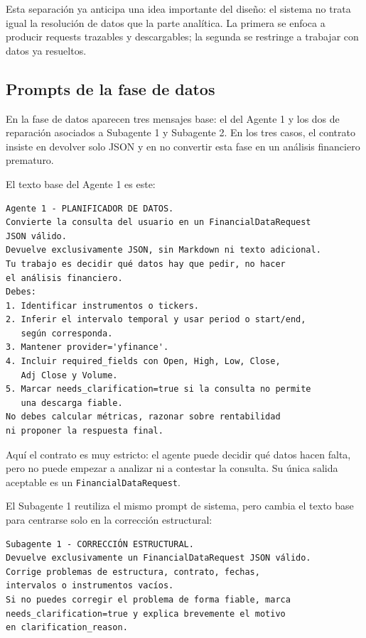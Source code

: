 Esta separaci\'on ya anticipa una idea importante del dise\~no: el sistema no trata igual la resoluci\'on de datos que la parte anal\'itica. La primera se
enfoca a producir requests trazables y descargables; la segunda se restringe a trabajar con datos ya resueltos.

\subsection{Prompts de la fase de datos}

En la fase de datos aparecen tres mensajes base: el del Agente 1 y los dos de reparaci\'on asociados a Subagente 1 y Subagente 2. En los tres casos, el
contrato insiste en devolver solo JSON y en no convertir esta fase en un an\'alisis financiero prematuro.

El texto base del Agente 1 es este:

\begin{lstlisting}[style=promptblock]
Agente 1 - PLANIFICADOR DE DATOS.
Convierte la consulta del usuario en un FinancialDataRequest
JSON válido.
Devuelve exclusivamente JSON, sin Markdown ni texto adicional.
Tu trabajo es decidir qué datos hay que pedir, no hacer
el análisis financiero.
Debes:
1. Identificar instrumentos o tickers.
2. Inferir el intervalo temporal y usar period o start/end,
   según corresponda.
3. Mantener provider='yfinance'.
4. Incluir required_fields con Open, High, Low, Close,
   Adj Close y Volume.
5. Marcar needs_clarification=true si la consulta no permite
   una descarga fiable.
No debes calcular métricas, razonar sobre rentabilidad
ni proponer la respuesta final.
\end{lstlisting}

Aqu\'i el contrato es muy estricto: el agente puede decidir qu\'e datos hacen falta, pero no puede empezar a analizar ni a contestar la consulta. Su \'unica
salida aceptable es un \texttt{FinancialDataRequest}.

El Subagente 1 reutiliza el mismo prompt de sistema, pero cambia el texto base para centrarse solo en la correcci\'on estructural:

\begin{lstlisting}[style=promptblock]
Subagente 1 - CORRECCIÓN ESTRUCTURAL.
Devuelve exclusivamente un FinancialDataRequest JSON válido.
Corrige problemas de estructura, contrato, fechas,
intervalos o instrumentos vacíos.
Si no puedes corregir el problema de forma fiable, marca
needs_clarification=true y explica brevemente el motivo
en clarification_reason.
\end{lstlisting}

